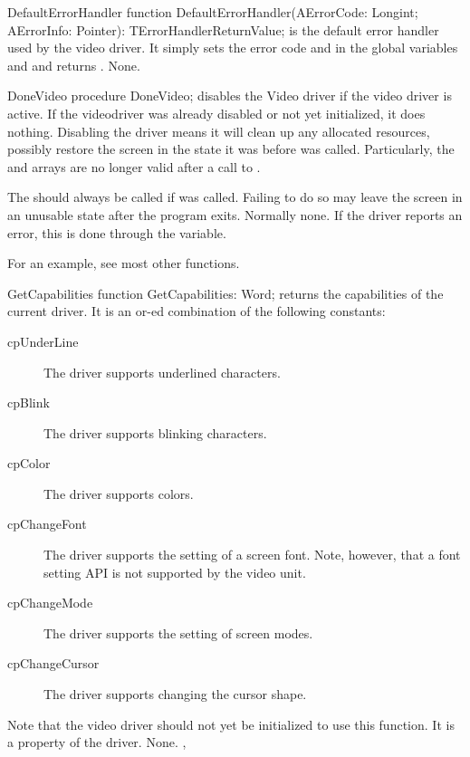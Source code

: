 \begin{procedure}{DefaultErrorHandler}
\Declaration
function  DefaultErrorHandler(AErrorCode: Longint; AErrorInfo: Pointer): TErrorHandlerReturnValue; 
\Description
{} is the default error handler used by the video
driver. It simply sets the error code  and  
in the global variables  and  and returns 
.
\Errors
None.
\SeeAlso
\end{procedure}

\begin{procedure}{DoneVideo}
\Declaration
procedure DoneVideo; 
\Description
{} disables the Video driver if the video driver is active. If
the videodriver was already disabled or not yet initialized, it does
nothing. Disabling the driver means it will clean up any allocated
resources, possibly restore the screen in the state it was before
 was called. Particularly, the  and
 arrays are no longer valid after a call to 
.

The  should always be called if  was called.
Failing to do so may leave the screen in an unusable state after the program
exits.
\Errors
Normally none. If the driver reports an error, this is done through the
 variable.
\SeeAlso
{}
\end{procedure}

For an example, see most other functions.

\begin{function}{GetCapabilities}
\Declaration
function GetCapabilities: Word; 
\Description
{} returns the capabilities of the current driver.
It is an or-ed combination of the following constants:
\begin{description}
\item[cpUnderLine] The driver supports underlined characters.
\item[cpBlink] The driver supports blinking characters.
\item[cpColor] The driver supports colors.
\item[cpChangeFont] The driver supports the setting of a screen font.
Note, however, that a font setting API is not supported by the video unit.
\item[cpChangeMode] The driver supports the setting of screen modes. 
\item[cpChangeCursor] The driver supports changing the cursor shape.
\end{description}
Note that the video driver should not yet be initialized to use this
function. It is a property of the driver.
\Errors
None.
\SeeAlso
{}, 
\end{function}

